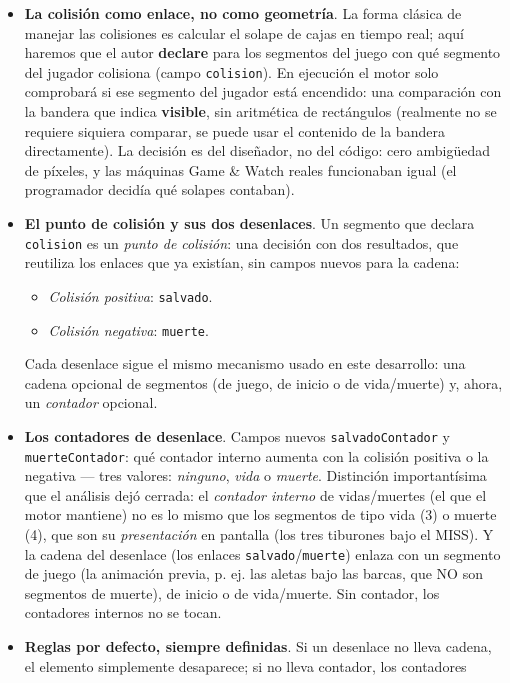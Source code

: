 \begin{itemize}
	\item \textbf{La colisión como enlace, no como geometría}. La forma clásica de manejar las colisiones es
	calcular el solape de cajas en tiempo real; aquí haremos que el
	autor \textbf{declare} para los segmentos del juego con qué segmento del jugador colisiona (campo
	\texttt{colision}). En ejecución el motor solo comprobará si ese segmento del
	jugador está encendido: una comparación con la bandera que indica \textbf{visible}, sin aritmética de rectángulos (realmente no se requiere siquiera comparar, se puede usar el contenido de la bandera directamente).
	La decisión es del diseñador, no del código: cero ambigüedad de píxeles, y las
	máquinas Game \& Watch reales funcionaban igual (el programador decidía qué
	solapes contaban).
	\item \textbf{El punto de colisión y sus dos desenlaces}. Un segmento que declara
	\texttt{colision} es un \emph{punto de colisión}: una decisión con dos resultados,
	que reutiliza los enlaces que ya existían, sin campos nuevos para la cadena:
	\begin{itemize}
		\item \emph{Colisión positiva}: \texttt{salvado}.
		\item \emph{Colisión negativa}: \texttt{muerte}.
	\end{itemize}
	Cada desenlace sigue el mismo mecanismo usado en este desarrollo: una cadena opcional de segmentos (de juego, de inicio o de vida/muerte) y, ahora, un
	\emph{contador} opcional.
	\item \textbf{Los contadores de desenlace}. Campos nuevos \texttt{salvadoContador} y
	\texttt{muerteContador}: qué contador interno aumenta con la colisión positiva o la
	negativa --- tres valores: \emph{ninguno}, \emph{vida} o \emph{muerte}. Distinción
	importantísima que el análisis dejó cerrada: el \emph{contador interno} de
	vidas/muertes (el que el motor mantiene) no es lo mismo que los segmentos de tipo
	vida (3) o muerte (4), que son su \emph{presentación} en pantalla (los tres
	tiburones bajo el MISS). Y la cadena del desenlace (los enlaces
	\texttt{salvado}/\texttt{muerte}) enlaza con un segmento de juego (la animación
	previa, p. ej. las aletas bajo las barcas, que NO son segmentos de muerte), de
	inicio o de vida/muerte. Sin contador, los contadores internos no se tocan.
	\item \textbf{Reglas por defecto, siempre definidas}. Si un desenlace no lleva
	cadena, el elemento simplemente desaparece; si no lleva contador, los contadores

\end{itemize}
